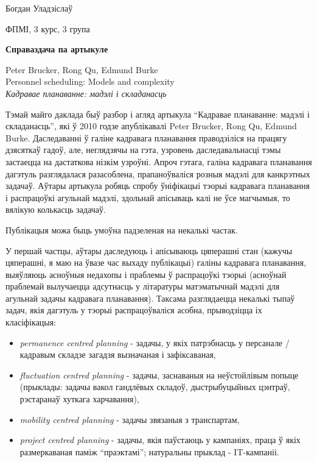 \documentclass{article}
\begin{document}
{\large

Богдан Уладзіслаў

ФПМІ, 3 курс, 3 група

\vspace{5mm}

\textbf{Справаздача па артыкуле}

\vspace{5mm}

Peter Brucker, Rong Qu, Edmund Burke \\
Personnel scheduling: Models and complexity \\
\textit{Кадравае планаванне: мадэлі і складанасць}
}

\vspace{5mm}

Тэмай майго даклада быў разбор і агляд артыкула ``Кадравае планаванне: мадэлі і складанасць'', які ў 2010 годзе
апублікавалі Peter Brucker, Rong Qu, Edmund Burke. Даследаванні ў галіне кадравага планавання праводзіліся на працягу
дзясяткаў гадоў, але, неглядзячы на гэта, узровень даследавальнасці тэмы застаецца на дастаткова нізкім узроўні. Апроч гэтага,
галіна кадравага планавання дагэтуль разглядалася разасоблена, прапаноўваліся розныя мадэлі для канкрэтных задачаў.
Аўтары артыкула робяць спробу ўніфікацыі тэорыі кадравага планавання і распрацоўкі агульнай мадэлі, здольнай апісываць калі не
ўсе магчымыя, то вялікую колькасць задачаў.

Публікацыя можа быць умоўна падзеленая на некалькі частак.

У першай частцы, аўтары даследуюць і апісываюць цяперашні стан (кажучы цяперашні, я маю на ўвазе час выхаду публікацыі)
галіны кадравага планавання, выяўляюць асноўныя недахопы і праблемы ў распрацоўкі тэорыі (асноўнай праблемай вылучаецца
адсутнасць у літаратуры матэматычнай мадэлі для агульнай задачы кадравага планавання). Таксама разглядаецца некалькі тыпаў задач,
якія дагэтуль у тэорыі распрацоўваліся асобна, прыводзіцца іх класіфікацыя:
\begin{itemize}
  \item \textit{permanence centred planning} - задачы, у якіх патрэбнасць у персанале / кадравым складзе
    загадзя вызначаная і зафіксаваная,
  \item \textit{fluctuation centred planning} - задачы, заснаваныя на неўстойлівым попыце (прыклады: задачы вакол
  гандлёвых складоў, дыстрыбуцыйных цэнтраў, рэстаранаў хуткага харчавання),
  \item \textit{mobility centred planning} - задачы звязаныя з транспартам,
  \item \textit{project centred planning} - задачы, якія паўстаюць у кампаніях, праца ў якіх размеркаваная паміж
  ``праэктамі''; натуральны прыклад - IT-кампаніі.
\end{itemize}
\end{document}
